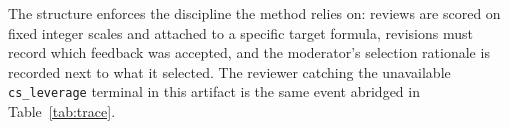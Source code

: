 \documentclass{article}
\theoremstyle{definition}
\theoremstyle{plain}
\theoremstyle{remark}
\begin{document}
The structure enforces the discipline the method relies on: reviews are scored on
fixed integer scales and attached to a specific target formula, revisions must record
which feedback was accepted, and the moderator's selection rationale is recorded next
to what it selected. The reviewer catching the unavailable \texttt{cs\_leverage}
terminal in this artifact is the same event abridged in Table~\ref{tab:trace}.
\end{document}
